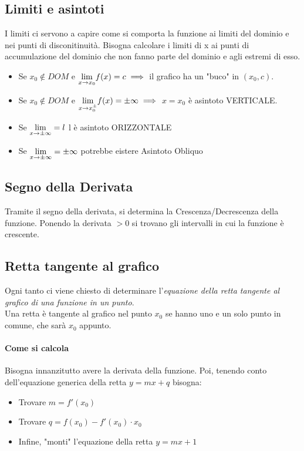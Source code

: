 \documentclass[12pt, a4paper, openany]{book}
\begin{document}
\subsection*{Limiti e asintoti}
I limiti ci servono a capire come si comporta la funzione ai limiti del dominio e nei punti di disconitinuità.
Bisogna calcolare i limiti di x ai punti di accumulazione del dominio che non fanno parte del dominio e agli estremi di esso.

\begin{itemize}
	\item Se $x_0 \notin DOM$ e $\underset{x \to x_0}{\lim} f(x) = c \implies$ il grafico ha un "buco" in $(x_0,c)$.
 \item Se $x_0 \notin DOM$ e $\underset{x \to x_{0}^\pm}{\lim} f(x) = \pm \infty \implies$ $x=x_0$ è asintoto VERTICALE.
 \item Se $\underset{x \to \pm \infty}{\lim} = l$ l è asintoto ORIZZONTALE
 \item Se $\underset{x \to \pm \infty}{\lim} = \pm \infty$ potrebbe eistere Asintoto Obliquo
\end{itemize}
\subsection*{Segno della Derivata}
Tramite il segno della derivata, si determina la Crescenza/Decrescenza della funzione.
Ponendo la derivata $>0$ si trovano gli intervalli in cui la funzione è crescente.

\subsection*{Retta tangente al grafico}
Ogni tanto ci viene chiesto di determinare l'\emph{equazione della retta tangente al grafico di una funzione in un punto}.
\\Una retta è tangente al grafico nel punto $x_0$ se hanno uno e un solo punto in comune, che sarà $x_0$ appunto.

\paragraph{Come si calcola}
Bisogna innanzitutto avere la derivata della funzione. Poi, tenendo conto dell'equazione generica della retta $y=mx+q$ bisogna:
\begin{itemize}
	\item Trovare $m= f'(x_0)$
 \item Trovare $q = f(x_0)-f'(x_0) \cdot x_0$
 \item Infine, "monti" l'equazione della retta $y=mx+1$
\end{itemize}
\end{document}
